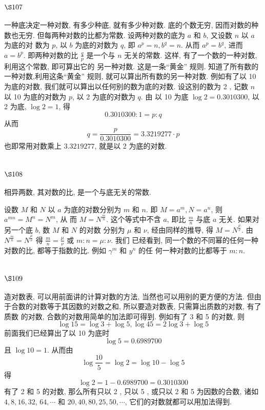 \section{$\S 107$}

一种底决定一种对数, 有多少种底, 就有多少种对数. 底的个数无穷, 因而对数的种 数也无穷. 但每两种对数的比都为常数. 设两种对数的底为 $a$ 和 $b$, 又设数 $n$ 以 $a$ 为底的对 数为 $p$, 以 $b$ 为底的对数为 $q$, 即 $a^{p}=n, b^{q}=n$. 从而 $a^{p}=b^{q}$, 进而 $a=b^{p}$. 即两种对数的比 $\frac{q}{p}$ 是一个与 $n$ 无关的常数. 这样, 有了一个数的一种对数, 利用这个常数, 即可算出它的 另一种对数. 这是一条“黄金” 规则. 知道了所有数的一种对数,利用这条“黄金” 规则, 就可以算出所有数的另一种对数. 例如有了以 10 为底的对数, 我们就可以算出以任何别的数为底的对数. 设这别的数为 2 , 记数 $n$ 以 10 为底的对数为 $p$, 以 2 为底的对数为 $q$. 由 以 10 为底 $\log 2=0.3010300$, 以 2 为底, $\log 2=1$, 得
\[
0. 3010300: 1=p: q
\]
从而
\[
q=\frac{p}{0.3010300}=3.3219277 \cdot p
\]
也即常用对数乘上 $3.3219277$, 就是以 2 为底的对数.

\section{$\S 108$}

相异两数, 其对数的比, 是一个与底无关的常数.

设数 $M$ 和 $N$ 以 $a$ 为底的对数分别为 $m$ 和 $n$. 即 $M=a^{m}, N=a^{n}$, 则 $a^{m n}=M^{n}=N^{m}$, 从 而 $M=N^{\frac{m}{n}}$. 这个等式中不含 $a$, 即比 $\frac{m}{n}$ 与底 $a$ 无关. 如果对另一个底 $b$, 数 $M$ 和 $N$ 的对数 分别为 $\mu$ 和 $\nu$, 经由同样的推导, 得 $M=N^{\frac{\mu}{\nu}}$. 由 $N^{\frac{m}{n}}=N^{\frac{\mu}{\nu}}$ 得 $\frac{m}{n}=\frac{\mu}{\nu}$ 或 $m: n=\mu: \nu$. 我们 已经看到, 同一个数的不同幂的任何一种对数的比, 都等于指数的比. 例如 $\gamma^{m}$ 和 $y^{n}$ 的任 何一种对数的比都等于 $m: n$.

\section{$\S 109$}

造对数表, 可以用前面讲的计算对数的方法, 当然也可以用别的更方便的方法. 但由 于合数的对数等于其因数的对数之和, 所以要造对数表, 只需算出质数的对数, 有了质数 的对数, 合数的对数用简单的加法即可得到. 例如有了 3 和 5 的对数, 则
\[
\log 15=\log 3+\log 5, \log 45=2 \log 3+\log 5
\]
前面我们已经算出了以 10 为底时
\[
\log 5=0.6989700
\]
且 $\log 10=1$. 从而由
\[
\log \frac{10}{5}=\log 2=\log 10-\log 5
\]
得
\[
\log 2=1-0.6989700=0.3010300
\]
有了 2 和 5 的对数, 那么所有只以 2 , 只以 5 , 或只以 2 和 5 为因数的合数, 诸如 $4,8,16,32$, $64, \cdots$ 和 $20,40,80,25,50, \cdots$, 它们的对数就都可以用加法得到.

